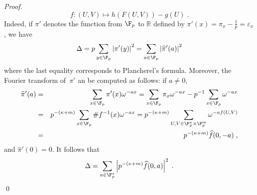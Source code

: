 \begin{proof}
  \[f: (U,V) \mapsto h(F(U,V)) - g(U)\;.\]
  Indeed, if \(\pi'\) denotes the function from \(\F_p\) to \(\mathbb{R}\) defined by \(\pi'(x) = \pi_x - \frac{1}{p} = \varepsilon_x\), we have
    \[\Delta = p \sum_{y \in \F_p} \left|\pi'(y)\right|^2 = \sum_{a \in \F_p} \left|{\widehat \pi'}(a)\right|^2\]
    where the last equality corresponds to Plancherel's formula.
    Moreover, the Fourier transform of~\(\pi'\) an be computed as follows: if \(a \neq 0\),
    \begin{eqnarray*}
      {\widehat \pi'}(a) & = & \sum_{x \in \F_p} \pi'(x) \omega^{-ax} = \sum_{x \in \F_p} \pi_x \omega^{-ax} - p^{-1} \sum_{x \in \F_p} \omega^{-ax}\\
      & = & p^{-(\kappa+m)} \sum_{x \in \F_p} \#f^{-1}(x) \omega^{-ax} = p^{-(\kappa+m)} \sum_{U,V \in \F_p^\kappa \times \F_p^m}  \omega^{-a f(U,V)}
      \\ & = & p^{-(\kappa+m)} {\widehat f}(0, -a)\;,
      \end{eqnarray*}
    and \({\widehat \pi'}(0) = 0\).
        It follows that
        \[\Delta = \sum_{a \in \F_p^*} \left|p^{-(\kappa+m)} {\widehat f}(0, a)\right|^2\;.\]
        \hfil\qed
\end{proof}



